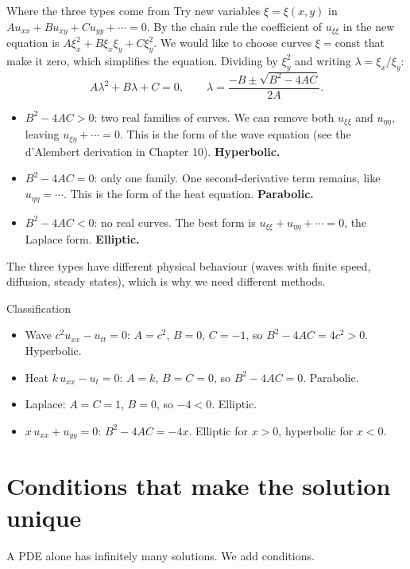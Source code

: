 \begin{derivbox}{Where the three types come from}
Try new variables $\xi = \xi(x,y)$ in $Au_{xx} + Bu_{xy} + Cu_{yy} + \cdots = 0$. By the chain rule the coefficient of $u_{\xi\xi}$ in the new equation is $A\xi_x^2 + B\xi_x\xi_y + C\xi_y^2$. We would like to choose curves $\xi = \text{const}$ that make it zero, which simplifies the equation. Dividing by $\xi_y^2$ and writing $\lambda = \xi_x/\xi_y$:
\[ A\lambda^2 + B\lambda + C = 0, \qquad \lambda = \frac{-B\pm\sqrt{B^2-4AC}}{2A}. \]
\begin{itemize}
  \item $B^2 - 4AC>0$: two real families of curves. We can remove both $u_{\xi\xi}$ and $u_{\eta\eta}$, leaving $u_{\xi\eta} + \cdots=0$. This is the form of the wave equation (see the d'Alembert derivation in Chapter 10). \textbf{Hyperbolic.}
  \item $B^2 - 4AC = 0$: only one family. One second-derivative term remains, like $u_{\eta\eta} = \cdots$. This is the form of the heat equation. \textbf{Parabolic.}
  \item $B^2 - 4AC<0$: no real curves. The best form is $u_{\xi\xi} + u_{\eta\eta}+\cdots=0$, the Laplace form. \textbf{Elliptic.}
\end{itemize}
The three types have different physical behaviour (waves with finite speed, diffusion, steady states), which is why we need different methods.
\end{derivbox}

\begin{examplebox}{Classification}
\begin{itemize}
  \item Wave $c^2u_{xx} - u_{tt} = 0$: $A = c^2$, $B=0$, $C=-1$, so $B^2 - 4AC = 4c^2>0$. Hyperbolic.
  \item Heat $k\,u_{xx} - u_t = 0$: $A=k$, $B=C=0$, so $B^2-4AC=0$. Parabolic.
  \item Laplace: $A=C=1$, $B=0$, so $-4<0$. Elliptic.
  \item $x\,u_{xx} + u_{yy} = 0$: $B^2-4AC = -4x$. Elliptic for $x>0$, hyperbolic for $x<0$.
\end{itemize}
\end{examplebox}

\section{Conditions that make the solution unique}

A PDE alone has infinitely many solutions. We add conditions.

